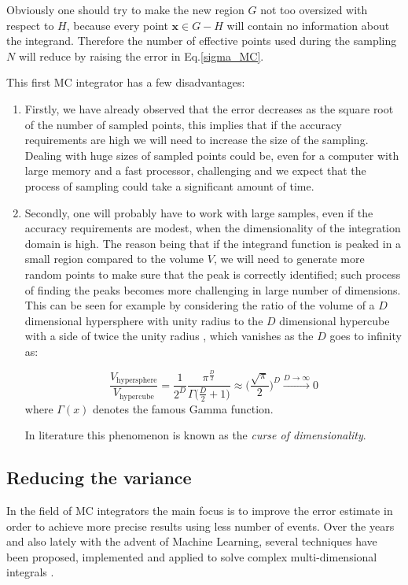 \documentclass[../main/main.tex]{subfiles}
\begin{document}
Obviously one should try to make the new region $G$ not too oversized with respect to $H$, because every 
point $\textbf{x} \in G - H$ will contain no information about the integrand. Therefore the number of 
effective points used during the sampling $N$ will reduce by raising the error in Eq.\eqref{sigma_MC}.

This first MC integrator has a few disadvantages:
\begin{enumerate}
\item Firstly, we have already observed that the error decreases as the square root of the number of sampled points, 
	this implies that if the accuracy requirements are high we will need to increase the size of the sampling. 
	Dealing with huge sizes of sampled points could be, even for a computer with large memory and a fast processor, 
	challenging and we expect that the process of sampling could take a significant amount of time.
	\item Secondly, one will probably have to work with large samples, even if the accuracy requirements are modest, when
	the dimensionality of the integration domain is high. The reason being that if the integrand function is peaked in a small
	region compared to the volume $V$, we will need to generate more random points to make sure that the peak is correctly 
	identified; such process of finding the peaks becomes more challenging in large number of dimensions.
	This can be seen for example by considering the ratio of the volume of a $D$ dimensional hypersphere with unity radius to the $D$ dimensional hypercube with a side of twice the unity radius , which vanishes as the $D$ goes to infinity as:
	
	\begin{equation}
		\frac{V_{\text{hypersphere}}}{V_{\text{hypercube} }} = \frac{1}{2^D} \frac{\pi^{\frac{D}{2}}}{\Gamma\big(\frac{D}{2} + 1\big)} \approx  \bigg( \frac{\sqrt{\pi}}{2} \bigg)^D \xrightarrow{D \rightarrow  \infty} 0
	\end{equation}
	where $\Gamma(x)$ denotes the famous Gamma function.
	
	In literature this phenomenon is known as the \emph{curse of dimensionality}.
\end{enumerate}




\subsection{Reducing the variance}
\label{redu_var}
In the field of MC integrators the main focus is to improve the error estimate in order to achieve more precise results using less number of
events. Over the years and also lately with the advent of Machine Learning, several techniques have been proposed, implemented and applied to solve complex multi-dimensional integrals \cite{Lepage:2020tgj, Carrazza:2020rdn, unknown}.
\end{document}
